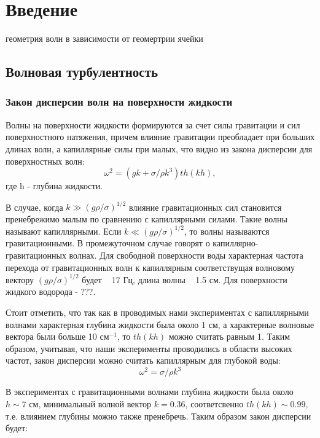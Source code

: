 \chapter{Введение} \label{chapt1}
геометрия волн в зависимости от геомертрии ячейки
\section{Волновая турбулентность} \label{sect1_1}
\subsection{Закон дисперсии волн на поверхности жидкости} \label{subsect1_1_1}

Волны на поверхности жидкости формируются за счет силы гравитации и сил поверхностного натяжения, причем влияние гравитации преобладает при больших длинах волн, а капиллярные силы при малых, что видно из закона дисперсии для поверхностных волн: 
\begin{equation}
 \label{eq:disper}
\omega^2 = (gk + \sigma/\rho k^3)th(kh),
\end{equation}
где h - глубина жидкости.

В случае, когда $k \gg (g\rho/\sigma)^{1/2}$ влияние гравитационных сил становится пренебрежимо малым по сравнению 
с капиллярными силами. Такие волны называют капиллярными. Если $k \ll (g\rho/\sigma)^{1/2}$, то волны называются 
гравитационными. В промежуточном случае говорят о капиллярно-гравитационных волнах. Для свободной поверхности воды 
характерная частота перехода от гравитационных волн к капиллярным соответствущая волновому вектору 
$(g\rho/\sigma)^{1/2}$ будет ~ 17 Гц, длина волны ~ 1.5 см. Для поверхности жидкого водорода - ???.

Стоит отметить, что так как в проводимых  нами экспериментах с капиллярными волнами характерная глубина жидкости была около 1 см, а характерные волновые вектора были больше 10 см$^{-1}$, то $th(kh)$ можно считать равным 1.
Таким образом, учитывая, что наши эксперименты проводились в области высоких частот, закон дисперсии можно считать капиллярным для глубокой воды:
\begin{equation}
 \label{eq:disperCap}
\omega^2 = \sigma/\rho k^3
\end{equation}

В экспериментах с гравитационными волнами глубина жидкости была около $ h \sim 7$ см, минимальный волной вектор $k = 0.36$, соответсвенно $th(kh) \sim 0.99$, т.е. влиянием глубины можно также пренебречь. Таким образом закон дисперсии будет:

